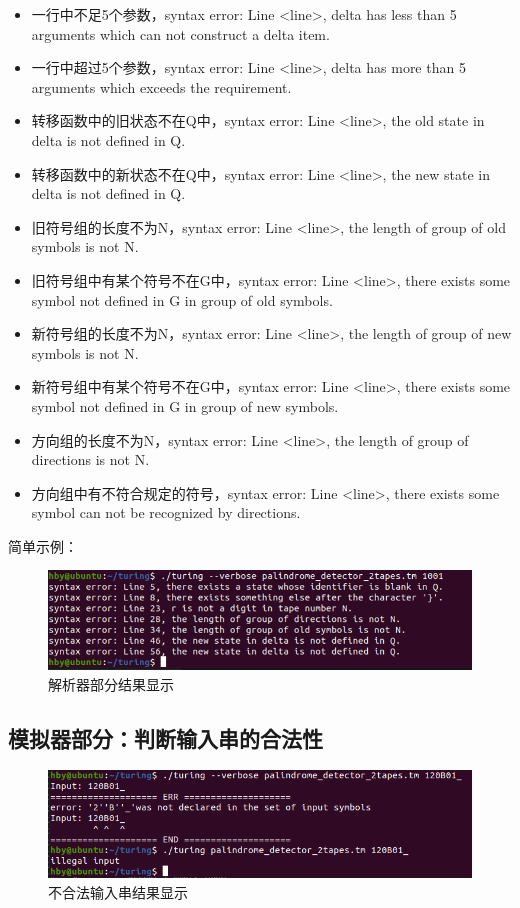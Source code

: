 \documentclass[UTF8]{article}
\begin{document}
 \begin{itemize}
    \item 一行中不足5个参数，syntax error: Line <line>, delta has less than 5 arguments which can not construct a delta item.
    \item 一行中超过5个参数，syntax error: Line <line>, delta has more than 5 arguments which exceeds the requirement.
    \item 转移函数中的旧状态不在Q中，syntax error: Line <line>, the old state in delta is not defined in Q.
	\item 转移函数中的新状态不在Q中，syntax error: Line <line>, the new state in delta is not defined in Q.
	\item 旧符号组的长度不为N，syntax error: Line <line>, the length of group of old symbols is not N.
	\item 旧符号组中有某个符号不在G中，syntax error: Line <line>, there exists some symbol not defined in G in group of old symbols.
	\item 新符号组的长度不为N，syntax error: Line <line>, the length of group of new symbols is not N.
	\item 新符号组中有某个符号不在G中，syntax error: Line <line>, there exists some symbol not defined in G in group of new symbols.
	\item 方向组的长度不为N，syntax error: Line <line>, the length of group of directions is not N.
    \item 方向组中有不符合规定的符号，syntax error: Line <line>, there exists some symbol can not be recognized by directions.
\end{itemize}

简单示例：
\begin{figure}[h]
  \centering
  \includegraphics[scale=0.8]{pic5.png}
  \caption{解析器部分结果显示}
\end{figure}

\subsection{模拟器部分：判断输入串的合法性}
\begin{figure}[h]
  \centering
  \includegraphics[scale=0.8]{pic6.png}
  \caption{不合法输入串结果显示}
\end{figure}
\end{document}
